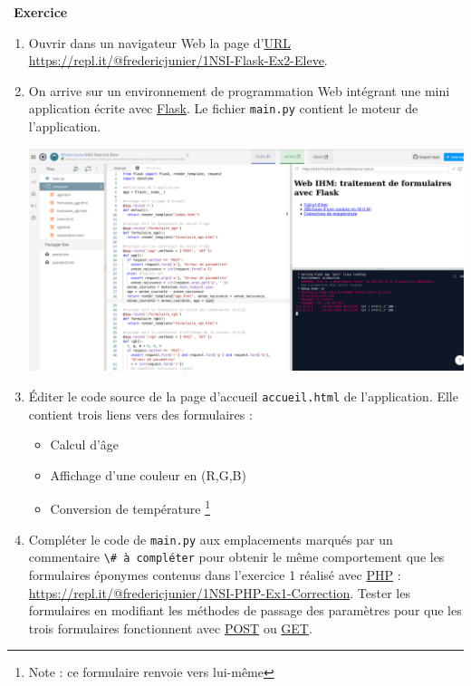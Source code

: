 \documentclass[
  11pt,
]{article}
\newcommand{\passthrough}[1]{#1}
\providecommand{\tightlist}{%
  \setlength{\itemsep}{0pt}\setlength{\parskip}{0pt}}
\newcounter{exo}
\newenvironment{exercice}[1]
{\par \medskip   \addtocounter{exo}{1} \noindent  
\begin{bclogo}[arrondi =0.1,   noborder = true, logo=\bccrayon, marge=4]{~\textbf{Exercice} \textbf{\theexo} {\itshape #1} }  \par}
{
\end{bclogo}
 \par \bigskip }
\newcounter{def}
\newcounter{prog}
\begin{document}
\begin{exercice}{}

\begin{enumerate}
\def\labelenumi{\arabic{enumi}.}
\item
  Ouvrir dans un navigateur Web la page
  d'\href{https://developer.mozilla.org/fr/docs/Glossaire/URL}{URL}
  \url{https://repl.it/@fredericjunier/1NSI-Flask-Ex2-Eleve}.
\item
  On arrive sur un environnement de programmation Web intégrant une mini
  application écrite avec
  \href{https://flask.palletsprojects.com/en/1.1.x/}{Flask}. Le fichier
  \passthrough{\lstinline!main.py!} contient le moteur de l'application.

  \includegraphics{images/flask-exemple2.png}\\
\item
  Éditer le code source de la page d'accueil
  \passthrough{\lstinline!accueil.html!} de l'application. Elle contient
  trois liens vers des formulaires :

  \begin{itemize}
  \tightlist
  \item
    Calcul d'âge\\
  \item
    Affichage d'une couleur en (R,G,B)
  \item
    Conversion de température \footnote{Note : ce formulaire renvoie
      vers lui-même}
  \end{itemize}
\item
  Compléter le code de \passthrough{\lstinline!main.py!} aux
  emplacements marqués par un commentaire
  \passthrough{\lstinline!\# à compléter!} pour obtenir le même
  comportement que les formulaires éponymes contenus dans l'exercice 1
  réalisé avec
  \href{https://developer.mozilla.org/fr/docs/Glossaire/PHP}{PHP} :
  \url{https://repl.it/@fredericjunier/1NSI-PHP-Ex1-Correction}. Tester
  les formulaires en modifiant les méthodes de passage des paramètres
  pour que les trois formulaires fonctionnent avec
  \href{https://developer.mozilla.org/fr/docs/Web/HTTP/M\%C3\%A9thode/POST}{POST}
  ou
  \href{https://developer.mozilla.org/fr/docs/Web/HTTP/M\%C3\%A9thode/GET}{GET}.
\end{enumerate}

\end{exercice}
\end{document}
